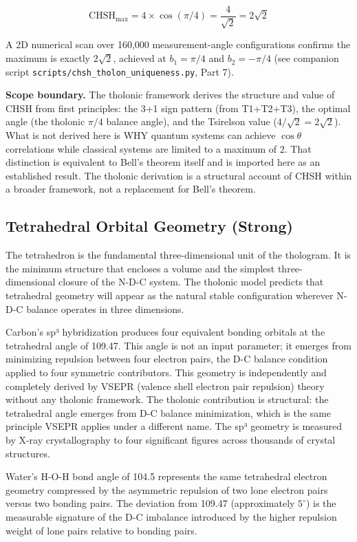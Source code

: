 \documentclass[12pt]{article}
\begin{document}
\[\mathrm{CHSH}_{\max} = 4 \times \cos(\pi/4) = \frac{4}{\sqrt{2}} = 2\sqrt{2}\]

A 2D numerical scan over 160,000 measurement-angle configurations
confirms the maximum is exactly \(2\sqrt{2}\), achieved at
\(b_1 = \pi/4\) and \(b_2 = -\pi/4\) (see companion script
\texttt{scripts/chsh\_tholon\_uniqueness.py}, Part 7).

\textbf{Scope boundary.} The tholonic framework derives the structure
and value of CHSH from first principles: the 3+1 sign pattern (from
T1+T2+T3), the optimal angle (the tholonic \(\pi/4\) balance angle), and
the Tsirelson value (\(4/\sqrt{2} = 2\sqrt{2}\)). What is not derived
here is WHY quantum systems can achieve \(\cos\theta\) correlations
while classical systems are limited to a maximum of 2. That distinction
is equivalent to Bell's theorem itself and is imported here as an
established result. The tholonic derivation is a structural account of
CHSH within a broader framework, not a replacement for Bell's theorem.

\subsection{Tetrahedral Orbital Geometry (Strong)}\label{tetrahedral-orbital-geometry-strong}

The tetrahedron is the fundamental three-dimensional unit of the
thologram. It is the minimum structure that encloses a volume and the
simplest three-dimensional closure of the N-D-C system. The tholonic
model predicts that tetrahedral geometry will appear as the natural
stable configuration wherever N-D-C balance operates in three
dimensions.

Carbon's sp³ hybridization produces four equivalent bonding orbitals at
the tetrahedral angle of 109.47\textdegree{}. This angle is not an input parameter;
it emerges from minimizing repulsion between four electron pairs, the
D-C balance condition applied to four symmetric contributors. This
geometry is independently and completely derived by VSEPR (valence shell
electron pair repulsion) theory without any tholonic framework. The
tholonic contribution is structural: the tetrahedral angle emerges from
D-C balance minimization, which is the same principle VSEPR applies
under a different name. The sp³ geometry is measured by X-ray
crystallography to four significant figures across thousands of crystal
structures.

Water's H-O-H bond angle of 104.5\textdegree{} represents the same tetrahedral
electron geometry compressed by the asymmetric repulsion of two lone
electron pairs versus two bonding pairs. The deviation from 109.47\textdegree{}
(approximately $5^\circ$) is the measurable signature of the D-C imbalance
introduced by the higher repulsion weight of lone pairs relative to
bonding pairs.
\end{document}
